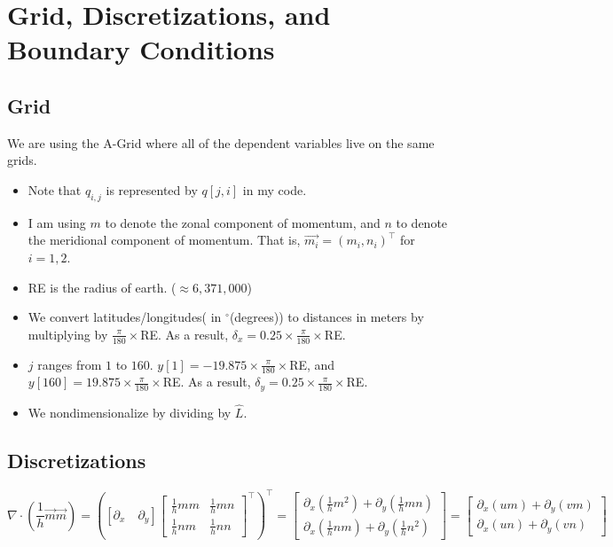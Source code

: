 \documentclass[10pt]{article}
\begin{document}
\section*{Grid, Discretizations, and Boundary Conditions}
\subsection*{Grid}
We are using the A-Grid where all of the dependent variables live on the same grids. 
\begin{itemize}
	\item Note that $q_{i,j}$ is represented by $q[j,i]$ in my code.
	\item I am using $m$ to denote the zonal component of momentum, and $n$ to denote the meridional component of momentum. That is, $\vec{m_i} = (m_i,n_i)^{\top}$ for $i=1,2$.
	\item RE is the radius of earth. ($\approx 6,371,000$)
	\item We convert latitudes/longitudes( in $^{\circ}$(degrees)) to distances in meters by multiplying by $\frac{\pi}{180}\times$RE. As a result, $\delta_x = 0.25 \times \frac{\pi}{180} \times $RE.
	\item $j$ ranges from $1$ to $160$. $y[1] = -19.875\times \frac{\pi}{180} \times $RE, and $y[160] = 19.875 \times \frac{\pi}{180} \times $RE. As a result, $\delta_y = 0.25 \times \frac{\pi}{180} \times $RE.
	\item We nondimensionalize by dividing by $\hat{L}$.
\end{itemize}

\subsection*{Discretizations}

$$
\nabla \cdot \left(\frac{1}{h}\vec{m}\vec{m}\right)
= 
\left([\partial_x \quad \partial_y]\begin{bmatrix}
\frac{1}{h}mm & \frac{1}{h}mn \\
\frac{1}{h}nm & \frac{1}{h}nn
\end{bmatrix}^{\top}\right)^{\top}
=
\begin{bmatrix}
\partial_x \left(\frac{1}{h}m^2\right) + \partial_y \left(\frac{1}{h}mn\right)
\\
\partial_x \left(\frac{1}{h}nm\right) + \partial_y \left(\frac{1}{h}n^2\right)
\end{bmatrix}
=
\begin{bmatrix}
\partial_x \left(um\right) + \partial_y \left(vm\right)
\\
\partial_x \left(un\right) + \partial_y \left(vn\right)
\end{bmatrix}
$$
\end{document}
